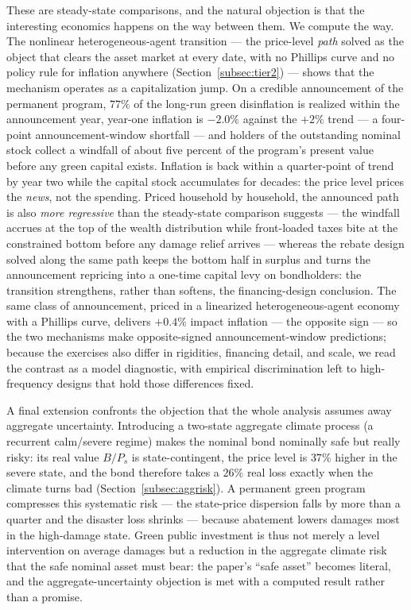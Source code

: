 \documentclass[12pt]{article}
\begin{document}
These are steady-state comparisons, and the natural objection is that the
interesting economics happens on the way between them. We compute the way. The
nonlinear heterogeneous-agent transition --- the price-level \emph{path} solved
as the object that clears the asset market at every date, with no Phillips
curve and no policy rule for inflation anywhere (Section~\ref{subsec:tier2}) ---
shows that the mechanism operates as a capitalization jump. On a credible
announcement of the permanent program, $77\%$ of the long-run green
disinflation is realized within the announcement year, year-one inflation is
$-2.0\%$ against the $+2\%$ trend --- a four-point announcement-window
shortfall --- and holders of the outstanding nominal stock collect a windfall
of about five percent of the program's present value before any green capital
exists. Inflation is back within a quarter-point of trend by year two while the
capital stock accumulates for decades: the price level prices the \emph{news},
not the spending. Priced household by household, the announced path is also
\emph{more regressive} than the steady-state comparison suggests --- the
windfall accrues at the top of the wealth distribution while front-loaded
taxes bite at the constrained bottom before any damage relief arrives ---
whereas the rebate design solved along the same path keeps the bottom half
in surplus and turns the announcement repricing into a one-time capital
levy on bondholders: the transition strengthens, rather than softens, the
financing-design conclusion. The same class of announcement, priced in a
linearized heterogeneous-agent economy with a Phillips curve, delivers
$+0.4\%$ impact inflation --- the opposite sign --- so the two mechanisms
make opposite-signed announcement-window predictions; because the
exercises also differ in rigidities, financing detail, and scale, we read
the contrast as a model diagnostic, with empirical discrimination left to
high-frequency designs that hold those differences fixed.

A final extension confronts the objection that the whole analysis assumes away
aggregate uncertainty. Introducing a two-state aggregate climate process (a
recurrent calm/severe regime) makes the nominal bond nominally safe but really
risky: its real value $B/P_s$ is state-contingent, the price level is $37\%$
higher in the severe state, and the bond therefore takes a $26\%$ real loss
exactly when the climate turns bad (Section~\ref{subsec:aggrisk}). A permanent
green program compresses this systematic risk --- the state-price dispersion
falls by more than a quarter and the disaster loss shrinks --- because
abatement lowers damages most in the high-damage state. Green public investment
is thus not merely a level intervention on average damages but a reduction in
the aggregate climate risk that the safe nominal asset must bear: the paper's
``safe asset'' becomes literal, and the aggregate-uncertainty objection is met
with a computed result rather than a promise.
\end{document}
